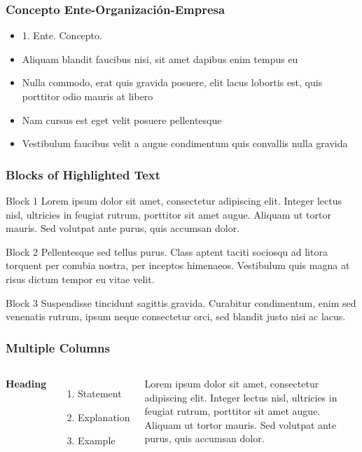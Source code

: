 \documentclass{beamer}
\begin{document}

\begin{frame}
\frametitle{Concepto Ente-Organización-Empresa}
\begin{itemize}
\item 1. Ente. Concepto.
\item Aliquam blandit faucibus nisi, sit amet dapibus enim tempus eu
\item Nulla commodo, erat quis gravida posuere, elit lacus lobortis est, quis porttitor odio mauris at libero
\item Nam cursus est eget velit posuere pellentesque
\item Vestibulum faucibus velit a augue condimentum quis convallis nulla gravida
\end{itemize}
\end{frame}


\begin{frame}
\frametitle{Blocks of Highlighted Text}
\begin{block}{Block 1}
Lorem ipsum dolor sit amet, consectetur adipiscing elit. Integer lectus nisl, ultricies in feugiat rutrum, porttitor sit amet augue. Aliquam ut tortor mauris. Sed volutpat ante purus, quis accumsan dolor.
\end{block}

\begin{block}{Block 2}
Pellentesque sed tellus purus. Class aptent taciti sociosqu ad litora torquent per conubia nostra, per inceptos himenaeos. Vestibulum quis magna at risus dictum tempor eu vitae velit.
\end{block}

\begin{block}{Block 3}
Suspendisse tincidunt sagittis gravida. Curabitur condimentum, enim sed venenatis rutrum, ipsum neque consectetur orci, sed blandit justo nisi ac lacus.
\end{block}
\end{frame}


\begin{frame}
\frametitle{Multiple Columns}
\begin{columns}[c] %

\textbf{Heading}
\begin{enumerate}
\item Statement
\item Explanation
\item Example
\end{enumerate}

Lorem ipsum dolor sit amet, consectetur adipiscing elit. Integer lectus nisl, ultricies in feugiat rutrum, porttitor sit amet augue. Aliquam ut tortor mauris. Sed volutpat ante purus, quis accumsan dolor.

\end{columns}
\end{frame}
\end{document}
